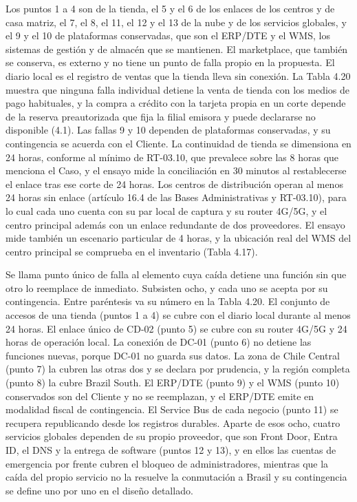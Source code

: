 \documentclass[11pt]{article}
\begin{document}
Los puntos 1 a 4 son de la tienda, el 5 y el 6 de los enlaces de los centros y de casa matriz, el 7, el 8, el 11, el 12 y el 13 de la nube y de los servicios globales, y el 9 y el 10 de plataformas conservadas, que son el ERP/DTE y el WMS, los sistemas de gestión y de almacén que se mantienen. El marketplace, que también se conserva, es externo y no tiene un punto de falla propio en la propuesta. El diario local es el registro de ventas que la tienda lleva sin conexión. La Tabla 4.20 muestra que ninguna falla individual detiene la venta de tienda con los medios de pago habituales, y la compra a crédito con la tarjeta propia en un corte depende de la reserva preautorizada que fija la filial emisora y puede declararse no disponible (4.1). Las fallas 9 y 10 dependen de plataformas conservadas, y su contingencia se acuerda con el Cliente. La continuidad de tienda se dimensiona en 24 horas, conforme al mínimo de RT-03.10, que prevalece sobre las 8 horas que menciona el Caso, y el ensayo mide la conciliación en 30 minutos al restablecerse el enlace tras ese corte de 24 horas. Los centros de distribución operan al menos 24 horas sin enlace (artículo 16.4 de las Bases Administrativas y RT-03.10), para lo cual cada uno cuenta con su par local de captura y su router 4G/5G, y el centro principal además con un enlace redundante de dos proveedores. El ensayo mide también un escenario particular de 4 horas, y la ubicación real del WMS del centro principal se comprueba en el inventario (Tabla 4.17).

Se llama punto único de falla al elemento cuya caída detiene una función sin que otro lo reemplace de inmediato. Subsisten ocho, y cada uno se acepta por su contingencia. Entre paréntesis va su número en la Tabla 4.20. El conjunto de accesos de una tienda (puntos 1 a 4) se cubre con el diario local durante al menos 24 horas. El enlace único de CD-02 (punto 5) se cubre con su router 4G/5G y 24 horas de operación local. La conexión de DC-01 (punto 6) no detiene las funciones nuevas, porque DC-01 no guarda sus datos. La zona de Chile Central (punto 7) la cubren las otras dos y se declara por prudencia, y la región completa (punto 8) la cubre Brazil South. El ERP/DTE (punto 9) y el WMS (punto 10) conservados son del Cliente y no se reemplazan, y el ERP/DTE emite en modalidad fiscal de contingencia. El Service Bus de cada negocio (punto 11) se recupera republicando desde los registros durables. Aparte de esos ocho, cuatro servicios globales dependen de su propio proveedor, que son Front Door, Entra ID, el DNS y la entrega de software (puntos 12 y 13), y en ellos las cuentas de emergencia por frente cubren el bloqueo de administradores, mientras que la caída del propio servicio no la resuelve la conmutación a Brasil y su contingencia se define uno por uno en el diseño detallado.
\end{document}

